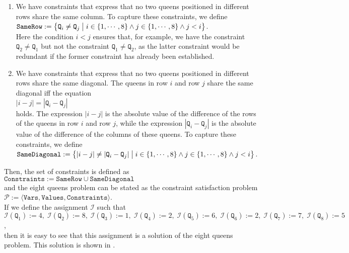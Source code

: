 \begin{enumerate}
\item We have constraints that express that no two queens positioned in different rows share the same column.
      To capture these constraints, we define
      \\[0.2cm]
      \hspace*{1.3cm}
      $\texttt{SameRow} := \bigl\{ \texttt{Q}_i \not= \texttt{Q}_j \bigm| i \in \{1,\cdots,8\} \wedge j \in \{1,\cdots,8\} \wedge j < i \bigr\}$.
      \\[0.2cm]
      Here the condition $i < j$ ensures that, for example, we have the constraint $\texttt{Q}_2 \not= \texttt{Q}_1$
      but not the constraint  $\texttt{Q}_1 \not= \texttt{Q}_2$, as the latter constraint would be redundant if
      the former constraint has already been established.
\item We have constraints that express that no two queens positioned in different rows share the same 
      diagonal.  The queens in row $i$ and row $j$ share the same diagonal iff the equation
      \\[0.2cm]
      \hspace*{1.3cm}
      $|i - j| = |\texttt{Q}_i - \texttt{Q}_j|$
      \\[0.2cm]
      holds.  The expression $|i-j|$ is the absolute value of the difference of the rows of the queens in row
      $i$ and row $j$,  while the expression $|\texttt{Q}_i - \texttt{Q}_j|$ is the absolute value of the difference of the
      columns of these queens.  To capture these constraints, we define
      \\[0.2cm]
      \hspace*{1.3cm}
      $\texttt{SameDiagonal} := \bigl\{ |i  - j| \not= |\texttt{Q}_i - \texttt{Q}_j| \bigm| i \in \{1,\cdots,8\} \wedge j \in \{1,\cdots,8\} \wedge j < i \bigr\}$.
\end{enumerate}
Then, the set of constraints is defined as 
\\[0.2cm]
\hspace*{1.3cm}
$\texttt{Constraints} := \texttt{SameRow} \cup \texttt{SameDiagonal}$
\\[0.2cm]
and the eight queens problem can be stated as the constraint satisfaction problem
\\[0.2cm]
\hspace*{1.3cm}
$\mathcal{P} := \langle \texttt{Vars}, \texttt{Values}, \texttt{Constraints} \rangle$.
\\[0.2cm]
If we define the assignment $\mathcal{I}$ such that
\\[0.2cm]
\hspace*{1.3cm}
$\mathcal{I}(\texttt{Q}_1) := 4,\; \mathcal{I}(\texttt{Q}_2) := 8,\; \mathcal{I}(\texttt{Q}_3) := 1,\; \mathcal{I}(\texttt{Q}_4) := 2,\; \mathcal{I}(\texttt{Q}_5) := 6,\; \mathcal{I}(\texttt{Q}_6) := 2,\; \mathcal{I}(\texttt{Q}_7) := 7,\; \mathcal{I}(\texttt{Q}_8) := 5$,
\\[0.2cm]
then it is easy to see that this assignment is a solution of the eight queens problem.  This solution is shown
in .


